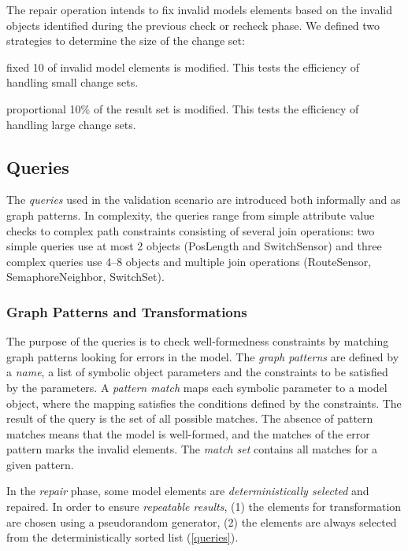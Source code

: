 \documentclass[submission,copyright,creativecommons]{eptcs}
\begin{document}
The repair operation intends to fix invalid models elements based on the invalid objects identified during the previous \textsf{check} or \textsf{recheck} phase. We defined two strategies to determine the size of the change set:

\begin{compactdesc}
\item[fixed] 10 of invalid model elements is modified. This tests the efficiency of handling small change sets.
\item[proportional] 10\% of the result set is modified. This tests the efficiency of handling large change sets.
\end{compactdesc}

\subsection{Queries}
\label{queries}

The \emph{queries} used in the validation scenario are introduced both informally and as graph patterns. In complexity, the queries range from simple attribute value checks to complex path constraints consisting of several join operations: two simple queries use at most 2 objects (\textsf{PosLength} and \textsf{SwitchSensor}) and three complex queries use 4--8 objects and multiple join operations (\textsf{RouteSensor}, \textsf{SemaphoreNeighbor}, \textsf{SwitchSet}). 

\subsubsection{Graph Patterns and Transformations}

The purpose of the queries is to check well-formedness constraints by matching graph patterns looking for errors in the model. The \emph{graph patterns} are defined by a \emph{name}, a list of symbolic object parameters and the constraints to be satisfied by the parameters. A \emph{pattern match} maps each symbolic parameter to a model object, where the mapping satisfies the conditions defined by the constraints. The result of the query is the set of all possible matches. The absence of pattern matches means that the model is well-formed, and the matches of the error pattern marks the invalid elements. The \emph{match set} contains all matches for a given pattern.

In the \emph{repair} phase, some model elements are \emph{deterministically selected} and repaired. In order to ensure \emph{repeatable results}, (1) the elements for transformation are chosen using a pseudorandom generator, (2) the elements are always selected from the deterministically sorted list (\autoref{queries}).
\end{document}
